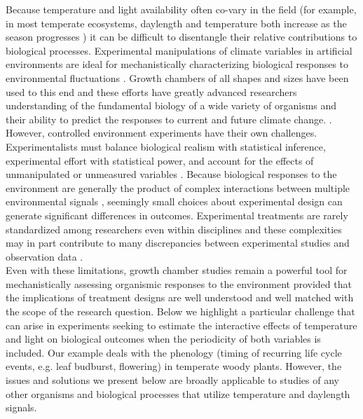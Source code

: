 \documentclass[11pt]{article}
\begin{document}
\noindent Because temperature and light availability often co-vary in the field (for example, in most temperate ecosystems, daylength and temperature both increase as the season progresses \citep{Rosenberg1974}) it can be difficult to disentangle their relative contributions to biological processes. Experimental manipulations of climate variables in artificial environments are ideal for mechanistically characterizing biological responses to environmental fluctuations \citep{Ettinger:2020aa,Primack2015}. Growth chambers of all shapes and sizes have been used to this end \citep{Downs:1980us} and these efforts have greatly advanced researchers understanding of the fundamental biology of a wide variety of organisms and their ability to predict the responses to current and future climate change. \citep{Stewart:2013wz}.\\ 

However, controlled environment experiments have their own challenges. Experimentalists must balance biological realism with statistical inference, experimental effort with statistical power, and account for the effects of unmanipulated or unmeasured variables \citep{schneiner2001}. Because biological responses to the environment are generally the product of complex interactions between multiple environmental signals \citep{Casal:2002vz}, seemingly small choices about experimental design can generate significant differences in outcomes. Experimental treatments are rarely standardized among researchers even within disciplines \citep{limitingcues} and these complexities may in part contribute to many discrepancies between experimental studies and observation data \citep{Poorter:2016aa}.\\

\noindent Even with these limitations, growth chamber studies remain a powerful tool for mechanistically assessing organismic responses to the environment provided that the implications of treatment designs are well understood and well matched with the scope of the research question. Below we highlight a particular challenge that can arise in experiments seeking to estimate the interactive effects of temperature and light on biological outcomes when the periodicity of both variables is included. Our example deals with the phenology (timing of recurring life cycle events, e.g. leaf budburst, flowering) in temperate woody plants. However, the issues and solutions we present below are broadly applicable to studies of any other organisms and biological processes that utilize temperature and daylength signals. \\
\end{document}
